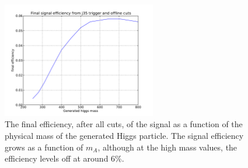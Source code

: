 
\begin{figure}
    \center
	\includegraphics[width=0.6\textwidth]{TriggerCuts/final_efficiency_vs_mass_j35.pdf}	
    \caption{The final efficiency, after all cuts, of the signal as a function of
    the physical mass of the generated Higgs particle.  The signal efficiency grows as a
    function of $m_A$, although at the high mass values, the efficiency levels off at around 6\%.\label{fig:final_eff_vs_mass}}
\end{figure}








